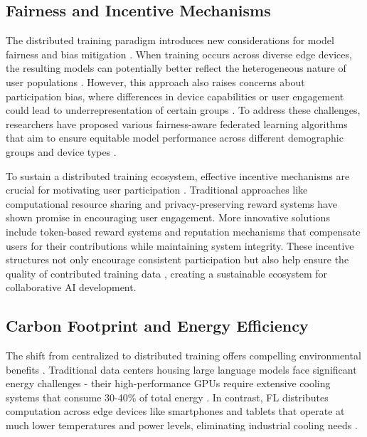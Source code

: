 \subsection{Fairness and Incentive Mechanisms}\label{subsec:fairness_and_incentive_mechanisms}

The distributed training paradigm introduces new considerations for model fairness and bias mitigation \cite{yao2024pursuit,li2020fair}. When training occurs across diverse edge devices, the resulting models can potentially better reflect the heterogeneous nature of user populations \cite{wang2020optimizing}. However, this approach also raises concerns about participation bias, where differences in device capabilities or user engagement could lead to underrepresentation of certain groups \cite{kairouz2021advances}. To address these challenges, researchers have proposed various fairness-aware federated learning algorithms \cite{mohri2019agnostic} that aim to ensure equitable model performance across different demographic groups and device types \cite{li2020fair}.

To sustain a distributed training ecosystem, effective incentive mechanisms are crucial for motivating user participation \cite{kang2019incentive}. Traditional approaches like computational resource sharing \cite{khan2019federated} and privacy-preserving reward systems \cite{zhan2020learning} have shown promise in encouraging user engagement. More innovative solutions include token-based reward systems \cite{incentive2024blockchain} and reputation mechanisms \cite{yang2019federated} that compensate users for their contributions while maintaining system integrity. These incentive structures not only encourage consistent participation but also help ensure the quality of contributed training data \cite{feng2019learning}, creating a sustainable ecosystem for collaborative AI development.

\subsection{Carbon Footprint and Energy Efficiency}\label{subsec:carbon_footprint_and_energy_efficiency}
The shift from centralized to distributed training offers compelling environmental benefits \cite{yang2024environmental}. Traditional data centers housing large language models face significant energy challenges\cite{li2024carbon} - their high-performance GPUs require extensive cooling systems that consume 30-40\% of total energy \cite{cooling}. In contrast, FL distributes computation across edge devices like smartphones and tablets that operate at much lower temperatures and power levels, eliminating industrial cooling needs \cite{fl_vs_centralized}.

